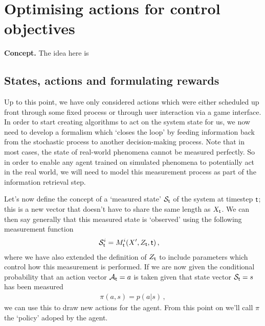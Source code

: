 \chapter{\sffamily Optimising actions for control objectives}

{\bfseries\sffamily Concept.} The idea here is 

\section{\sffamily States, actions and formulating rewards}

Up to this point, we have only considered actions which were either scheduled up front through some fixed process or through user interaction via a game interface. In order to start creating algorithms to act on the system state for us, we now need to develop a formalism which `closes the loop' by feeding information back from the stochastic process to another decision-making process. Note that in most cases, the state of real-world phenomena cannot be measured perfectly. So in order to enable any agent trained on simulated phenomena to potentially act in the real world, we will need to model this measurement process as part of the information retrieval step.

Let's now define the concept of a `measured state' ${\cal S}_{{\sf t}}$ of the system at timestep ${\sf t}$; this is a new vector that doesn't have to share the same length as $X_{\sf t}$. We can then say generally that this measured state is `observed' using the following measurement function
\begin{align}
{\cal S}_{{\sf t}}^i &= M_{{\sf t}}^i(X', Z_{\sf t}, {\sf t}) \label{eq:generalised-state-measurement} \,,
\end{align}
where we have also extended the definition of $Z_{\sf t}$ to include parameters which control how this measurement is performed. If we are now given the conditional probability that an action vector ${\cal A}_{\sf t}=a$ is taken given that state vector ${\cal S}_{\sf t}=s$ has been measured
\begin{align}
\pi (a,s) = p(a\vert s) \,,
\end{align}
we can use this to draw new actions for the agent. From this point on we'll call $\pi$ the `policy' adoped by the agent.

